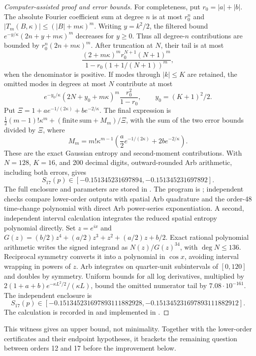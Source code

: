 \begin{proof}[Computer-assisted proof and error bounds]
For completeness, put $r_0=|a|+|b|$. The absolute Fourier coefficient sum
at degree $n$ is at most $r_0^n$ and
$|T_m(B,\kappa)|\le(|B|+m\kappa)^m$.
Writing $y=k^2/2$, the filtered bound
$e^{-y/\kappa}(2n+y+m\kappa)^m$ decreases for $y\ge0$.
Thus all degree-$n$ contributions are bounded by
$r_0^n(2n+m\kappa)^m$. After truncation at $N$, their tail is at most
\[
 \frac{(2+m\kappa)^m r_0^{N+1}(N+1)^m}
 {1-r_0(1+1/(N+1))^m},
\]
when the denominator is positive. If modes through $|k|\le K$ are retained,
the omitted modes in degrees at most $N$ contribute at most
\[
 e^{-y_0/\kappa}(2N+y_0+m\kappa)^m\frac{r_0^2}{1-r_0},
 \qquad y_0=(K+1)^2/2.
\]
Put $\Xi=1+ae^{-1/(2\kappa)}+be^{-2/\kappa}$. The final expression is
$\tfrac12(m-1)!\kappa^m+(\mathrm{finite\ sum}+M_m)/\Xi$, with the
sum of the two error bounds divided by $\Xi$, where
\[
 M_m=m!\kappa^{m-1}\left(\frac a2 e^{-1/(2\kappa)}+2be^{-2/\kappa}\right).
\]
These are the exact Gaussian entropy and second-moment contributions. With $N=128$, $K=16$, and 200 decimal digits, outward-rounded Arb
arithmetic, including both errors, gives
\[
 S_{17}(p)\in[-0.151345231697894,
              -0.151345231697892].
\]
The full enclosure and parameters are stored in
. The program is
; independent checks compare lower-order
outputs with spatial Arb quadrature and the order-48 time-change polynomial
with direct Arb power-series exponentiation.
A second, independent interval calculation integrates the reduced spatial
entropy polynomial directly. Set $z=e^{ix}$ and
$G(z)=(b/2)z^4+(a/2)z^3+z^2+(a/2)z+b/2$.
Exact rational polynomial arithmetic writes the signed integrand as
$N(z)/G(z)^{34}$, with $\deg N\le136$. Reciprocal symmetry converts it
into a polynomial in $\cos x$, avoiding interval wrapping in powers of $z$.
Arb integrates on quarter-unit subintervals of $[0,120]$ and doubles by
symmetry. Uniform bounds for all log derivatives, multiplied by
$2(1+a+b)e^{-\kappa L^2/2}/(\kappa L)$, bound the omitted numerator tail
by $7.08\cdot10^{-161}$. The independent enclosure is
\[
 S_{17}(p)\in[-0.151345231697893111882928,
              -0.151345231697893111882912].
\]
The calculation is recorded in
 and implemented in
.
\end{proof}
This witness gives an upper bound, not minimality. Together with the
lower-order certificates and their endpoint hypotheses, it brackets the
remaining question between orders 12 and 17 before the improvement below.


